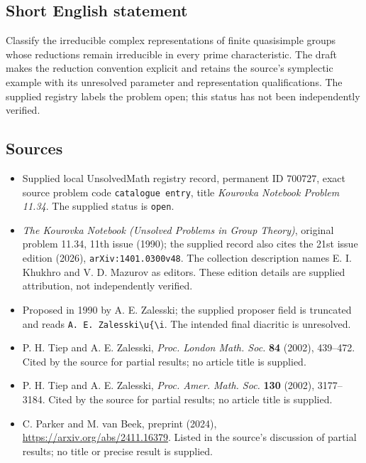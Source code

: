 \documentclass[11pt]{article}
\begin{document}
\subsection{Short English statement}
Classify the irreducible complex representations of finite quasisimple groups whose reductions remain irreducible in every prime characteristic. The draft makes the reduction convention explicit and retains the source's symplectic example with its unresolved parameter and representation qualifications. The supplied registry labels the problem open; this status has not been independently verified.
\subsection{Sources}
\begin{itemize}
\item Supplied local UnsolvedMath registry record, permanent ID \(700727\), exact source problem code \texttt{catalogue entry}, title \emph{Kourovka Notebook Problem 11.34}. The supplied status is \texttt{open}.
\item \emph{The Kourovka Notebook (Unsolved Problems in Group Theory)}, original problem 11.34, 11th issue (1990); the supplied record also cites the 21st issue edition (2026), \texttt{arXiv:1401.0300v48}. The collection description names E. I. Khukhro and V. D. Mazurov as editors. These edition details are supplied attribution, not independently verified.
\item Proposed in 1990 by A. E. Zalesski; the supplied proposer field is truncated and reads \texttt{A. E. Zalesski\textbackslash u\{\textbackslash i}. The intended final diacritic is unresolved.
\item P. H. Tiep and A. E. Zalesski, \emph{Proc. London Math. Soc.} \textbf{84} (2002), 439--472. Cited by the source for partial results; no article title is supplied.
\item P. H. Tiep and A. E. Zalesski, \emph{Proc. Amer. Math. Soc.} \textbf{130} (2002), 3177--3184. Cited by the source for partial results; no article title is supplied.
\item C. Parker and M. van Beek, preprint (2024), \url{https://arxiv.org/abs/2411.16379}. Listed in the source's discussion of partial results; no title or precise result is supplied.
\end{itemize}
\end{document}
